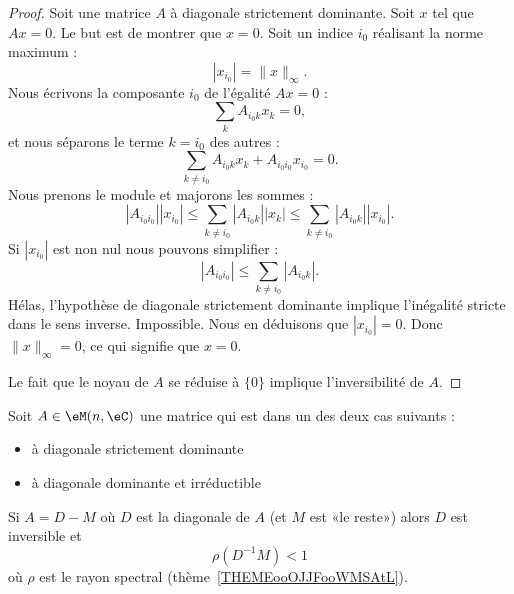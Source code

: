 \begin{proof}
	Soit une matrice \( A\) à diagonale strictement dominante. Soit \( x\) tel que \( Ax=0\). Le but est de montrer que \( x=0\). Soit un indice \( i_0\) réalisant la norme maximum :
	\begin{equation}
		| x_{i_0} |=\| x \|_{\infty}.
	\end{equation}
	Nous écrivons la composante \( i_0\) de l'égalité \( Ax=0\) :
	\begin{equation}
		\sum_kA_{i_0k}x_k=0,
	\end{equation}
	et nous séparons le terme \( k=i_0\) des autres :
	\begin{equation}
		\sum_{k\neq i_0}A_{i_0k}x_k+A_{i_0i_0}x_{i_0}=0.
	\end{equation}
	Nous prenons le module et majorons les sommes :
	\begin{equation}
		| A_{i_0i_0} | |x_{i_0} |\leq \sum_{k\neq i_0}| A_{i_0k} | |x_k |\leq \sum_{k\neq i_0}| A_{i_0k} | |x_{i_0} |.
	\end{equation}
	Si \( | x_{i_0} | \) est non nul nous pouvons simplifier :
	\begin{equation}
		| A_{i_0i_0} |\leq \sum_{k\neq i_0}| A_{i_0k} |.
	\end{equation}
	Hélas, l'hypothèse de diagonale strictement dominante implique l'inégalité stricte dans le sens inverse. Impossible. Nous en déduisons que \( | x_{i_0} |=0\). Donc \( \| x \|_{\infty}=0\), ce qui signifie que \( x=0\).

	Le fait que le noyau de \( A\) se réduise à \( \{ 0 \}\) implique l'inversibilité de \( A\).
\end{proof}

\begin{proposition}     \label{PROPooTQWUooSLoniQ}
	Soit \( A\in \eM(n,\eC)\) une matrice qui est dans un des deux cas suivants :
	\begin{itemize}
		\item à diagonale strictement dominante
		\item à diagonale dominante et irréductible
	\end{itemize}
	Si \( A=D-M\) où \( D\) est la diagonale de \( A\) (et \( M\) est «le reste») alors \( D\) est inversible et
	\begin{equation}
		\rho(D^{-1}M)<1
	\end{equation}
	où \( \rho\) est le rayon spectral (thème~\ref{THEMEooOJJFooWMSAtL}).
\end{proposition}

